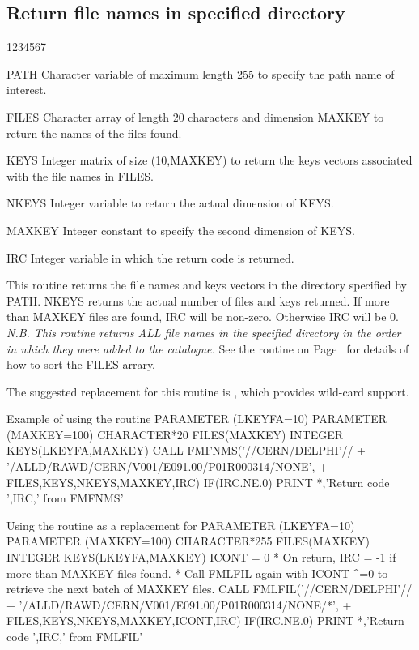 \subsection{Return file names in specified directory}
\begin{DLtt}{1234567}
\item [PATH]
Character variable of maximum length 255 to specify the path name of
interest.
\item[FILES]
Character array of length 20 characters and dimension MAXKEY
to return the names of the files found.
\item[KEYS]
Integer matrix of size (10,MAXKEY) to return the keys
vectors associated with the file names in FILES.
\item[NKEYS]
Integer variable to return the actual dimension of KEYS.
\item[MAXKEY]
Integer constant to specify the second dimension of KEYS.
\item[IRC]
Integer variable in which the return code is returned.
\end{DLtt}
\par
This routine returns the file names and keys vectors
in the directory specified by PATH.
NKEYS returns the actual number of files and keys returned.
If more than MAXKEY files are found, IRC will be non-zero.
Otherwise IRC will be 0.
\newpage
{\it N.B. This routine returns ALL file names in the specified
directory in the order in which they were added to the catalogue.}
See the routine on Page~\pageref{FMSORT} for details of how to
sort the FILES arrary.
\par
The suggested replacement for this routine is , which 
provides wild-card support.
\begin{XMPt}{Example of using the \protect{} routine}
      PARAMETER     (LKEYFA=10)
      PARAMETER     (MAXKEY=100)
      CHARACTER*20  FILES(MAXKEY)
      INTEGER       KEYS(LKEYFA,MAXKEY)
      CALL FMFNMS('//CERN/DELPHI'//
     +            '/ALLD/RAWD/CERN/V001/E091.00/P01R000314/NONE',
     +            FILES,KEYS,NKEYS,MAXKEY,IRC)
      IF(IRC.NE.0) PRINT *,'Return code ',IRC,' from FMFNMS'
\end{XMPt}
\begin{XMPt}{Using the \protect{} routine as a replacement for \protect{}}
      PARAMETER     (LKEYFA=10)
      PARAMETER     (MAXKEY=100)
      CHARACTER*255  FILES(MAXKEY)
      INTEGER        KEYS(LKEYFA,MAXKEY)
      ICONT = 0
*     On return, IRC = -1 if more than MAXKEY files found.
*     Call FMLFIL again with ICONT ^=0 to retrieve the next batch of MAXKEY files.
      CALL FMLFIL('//CERN/DELPHI'//
     +            '/ALLD/RAWD/CERN/V001/E091.00/P01R000314/NONE/*',
     +            FILES,KEYS,NKEYS,MAXKEY,ICONT,IRC)
      IF(IRC.NE.0) PRINT *,'Return code ',IRC,' from FMLFIL'
\end{XMPt}
